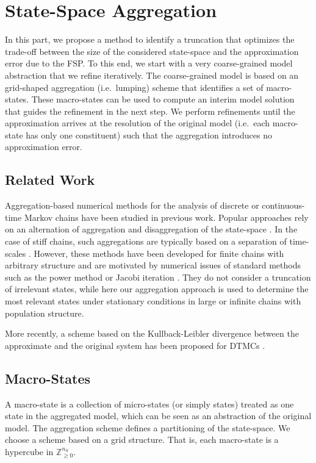 \chapter{State-Space Aggregation}\label{ch:lumping}
In this part, we propose a  method to identify a truncation that
optimizes the trade-off between the size of the considered
state-space and the approximation error due to the \acf{FSP}\@.
To this end, we start with a very coarse-grained model abstraction
that we refine iteratively.
The coarse-grained model is based on an grid-shaped aggregation
(i.e.\ lumping) scheme that identifies a set of macro-states.
These macro-states can be used to compute an interim model solution
that guides the refinement in the next step.
We perform refinements until the approximation arrives at the
resolution of the original model (i.e.\ each macro-state has only one
constituent) such that the aggregation introduces no approximation error.

\section{Related Work}
Aggregation-based numerical methods for the analysis
of discrete or continuous-time Markov chains have been studied in
previous work. Popular approaches rely on an alternation of aggregation and
disaggregation of the state-space
\parencite{stewart1994introduction,schweitzer1991survey}.
In the case of stiff chains, such aggregations are typically based on
a separation of time-scales \parencite{cao1985iterative}.
However, these methods have been developed for finite chains with
arbitrary structure and are motivated by numerical issues of standard
methods such as
the power method or Jacobi iteration \parencite{stewart1994introduction}.
They do not consider a truncation of irrelevant states, while
here our aggregation approach is used to determine the most relevant states
under stationary conditions in large or infinite chains with
population structure.

More recently, a scheme based on the Kullback-Leibler divergence
between the approximate and the original system has been proposed for
\acp{DTMC} \parencite{geiger2014optimal}.

\section{Macro-States}
A macro-state is a collection of micro-states (or simply states)
treated as one state in the aggregated model, which can be seen as an
abstraction of the original model.
The aggregation scheme defines a partitioning of the state-space.
We choose a scheme based on a grid structure. That is, each
macro-state is a hypercube in $\mathbb{Z}_{\geq 0}^{n_S}$.

